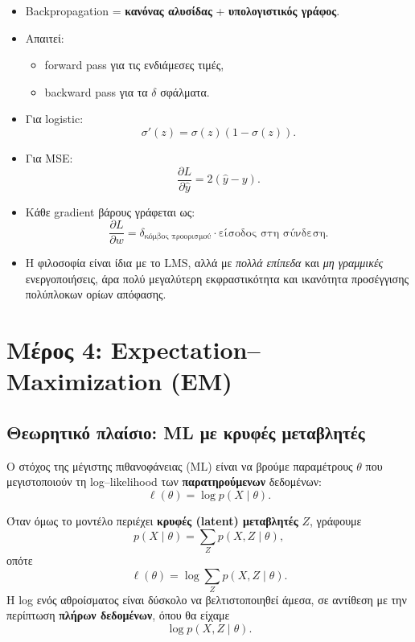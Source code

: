 \documentclass[a4paper,11pt]{article}
\begin{document}
\begin{itemize}
  \item Backpropagation = \textbf{κανόνας αλυσίδας} + \textbf{υπολογιστικός γράφος}.
  \item Απαιτεί:
        \begin{itemize}
          \item forward pass για τις ενδιάμεσες τιμές,
          \item backward pass για τα $\delta$ σφάλματα.
        \end{itemize}
  \item Για logistic:
        \[
        \sigma'(z) = \sigma(z)(1-\sigma(z)).
        \]
  \item Για MSE:
        \[
        \frac{\partial L}{\partial \hat{y}} = 2(\hat{y}-y).
        \]
  \item Κάθε gradient βάρους γράφεται ως:
        \[
        \frac{\partial L}{\partial w} = \delta_{\text{κόμβος προορισμού}} \cdot
        \text{είσοδος στη σύνδεση}.
        \]
  \item Η φιλοσοφία είναι ίδια με το LMS, αλλά με \emph{πολλά επίπεδα}
        και \emph{μη γραμμικές} ενεργοποιήσεις, άρα πολύ μεγαλύτερη εκφραστικότητα
        και ικανότητα προσέγγισης πολύπλοκων ορίων απόφασης.
\end{itemize}

\clearpage

\section{Μέρος 4: Expectation–Maximization (EM)}

\subsection{Θεωρητικό πλαίσιο: ML με κρυφές μεταβλητές}

Ο στόχος της μέγιστης πιθανοφάνειας (ML) είναι να βρούμε παραμέτρους $\theta$
που μεγιστοποιούν τη log–likelihood των \textbf{παρατηρούμενων} δεδομένων:
\[
\ell(\theta) = \log p(X \mid \theta).
\]

Όταν όμως το μοντέλο περιέχει \textbf{κρυφές (latent) μεταβλητές} $Z$,
γράφουμε
\[
p(X \mid \theta) = \sum_Z p(X,Z \mid \theta),
\]
οπότε
\[
\ell(\theta) = \log \sum_Z p(X,Z \mid \theta).
\]
Η log ενός αθροίσματος είναι δύσκολο να βελτιστοποιηθεί άμεσα,
σε αντίθεση με την περίπτωση \textbf{πλήρων δεδομένων}, όπου θα είχαμε
\[
\log p(X,Z \mid \theta).
\]
\end{document}
